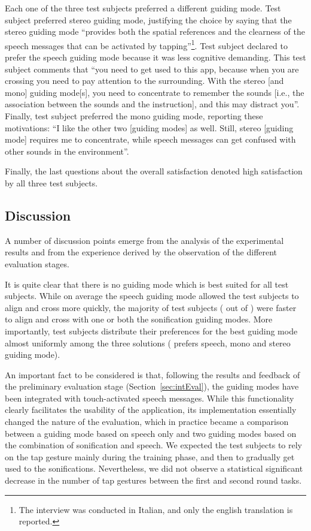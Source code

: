 \documentclass{article}
\begin{document}
Each one of the three test subjects preferred a different guiding mode. Test subject  preferred stereo guiding mode, justifying the choice by saying that the stereo guiding mode ``provides both the spatial references and the clearness of the speech messages that can be activated by tapping''\footnote{The interview was conducted in Italian, and only the english translation is reported.}.
Test subject  declared to prefer the speech guiding mode because it was less cognitive demanding. This test subject comments that ``you need to get used to this app, because when you are crossing you need to pay attention to the surrounding. With the stereo [and mono] guiding mode[s], you need to concentrate to remember the sounds [i.e., the association between the sounds and the instruction], and this may distract you''.
Finally, test subject  preferred the mono guiding mode, reporting these motivations: ``I like the other two [guiding modes] as well. Still, stereo [guiding mode] requires me to concentrate, while speech messages can get confused with other sounds in the environment''.

Finally, the last questions about the overall satisfaction denoted high satisfaction by all three test subjects.

\subsection{Discussion}
\label{sub:discussion}

A number of discussion points emerge from the analysis of the experimental results and from the experience derived by the observation of the different evaluation stages.

It is quite clear that there is no guiding mode which is best suited for all test subjects.
While on average the speech guiding mode allowed the test subjects to align and cross more quickly,
the majority of test subjects ( out of ) were faster to align and cross with one or both the sonification guiding modes.
More importantly, test subjects distribute their preferences for the best guiding mode almost uniformly among the three solutions ( prefers speech,  mono and  stereo guiding mode).

An important fact to be considered is that, following the results and feedback of the preliminary evaluation stage (Section~\ref{sec:intEval}), the guiding modes have been integrated with touch-activated speech messages.
While this functionality clearly facilitates the usability of the application, its implementation essentially changed the nature of the evaluation, which in practice became a comparison between a guiding mode based on speech only and two guiding modes based on the combination of sonification and speech.
We expected the test subjects to rely on the tap gesture mainly during the training phase, and then to gradually get used to the sonifications. Nevertheless, we did not observe a statistical significant decrease in the number of tap gestures between the first and second round tasks.
\end{document}
